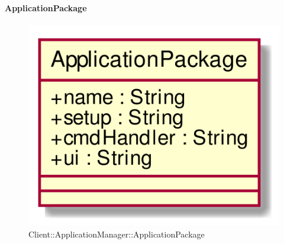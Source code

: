 \hypertarget{ApplicationPackage_label}{\paragraph{ApplicationPackage}}
\begin{figure}[h]
	\centering
	\includegraphics[width=\textwidth,height=\textheight,keepaspectratio]{images/ClassApplicationPackage.png}
	\caption{Client::ApplicationManager::ApplicationPackage}
\end{figure}
